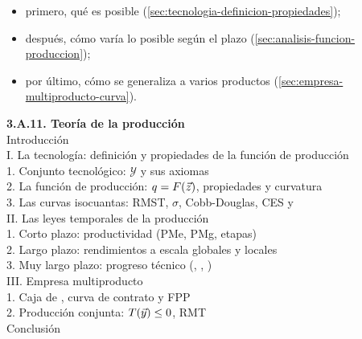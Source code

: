 \documentclass[11pt]{article}
\begin{document}
\begin{itemize}
\begin{itemize}
\begin{itemize}
    \begin{itemize}
    \item primero, qué es posible (\ref{sec:tecnologia-definicion-propiedades});
    \item después, cómo varía lo posible según el plazo (\ref{sec:analisis-funcion-produccion});
    \item por último, cómo se generaliza a varios productos (\ref{sec:empresa-multiproducto-curva}).
    \end{itemize}
  \end{itemize}
  \end{itemize}
\end{itemize}

\begin{esquema}
\textbf{3.A.11. Teoría de la producción}\\[2pt]
Introducción\\
I. La tecnología: definición y propiedades de la función de producción\\
\hspace*{1.5em}1. Conjunto tecnológico: $\mathcal{Y}$ y sus axiomas\\
\hspace*{1.5em}2. La función de producción: $q=F(\vec{z})$, propiedades y curvatura\\
\hspace*{1.5em}3. Las curvas isocuantas: RMST, $\sigma$, Cobb-Douglas, CES y \\
II. Las leyes temporales de la producción\\
\hspace*{1.5em}1. Corto plazo: productividad (PMe, PMg, etapas)\\
\hspace*{1.5em}2. Largo plazo: rendimientos a escala globales y locales\\
\hspace*{1.5em}3. Muy largo plazo: progreso técnico (, , )\\
III. Empresa multiproducto\\
\hspace*{1.5em}1. Caja de , curva de contrato y FPP\\
\hspace*{1.5em}2. Producción conjunta: $T(\vec{y})\leq 0$, RMT\\
Conclusión
\end{esquema}
\end{document}
